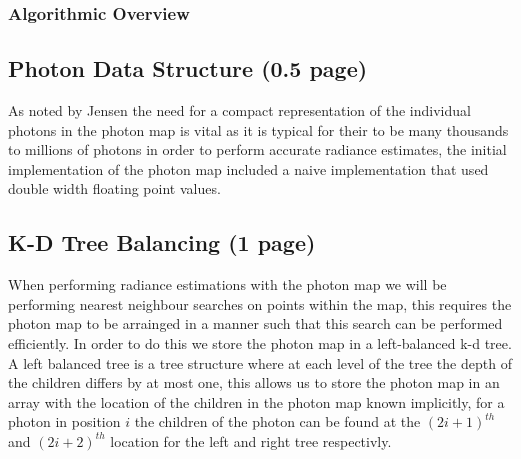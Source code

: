 \subsubsection{Algorithmic Overview}
%
%
%	

\subsection{Photon Data Structure (0.5 page)}
As noted by Jensen  the need for a compact representation of the individual photons in the photon map is vital
as it is typical for their to be many thousands to millions of photons in order to perform accurate radiance estimates,
the initial implementation of the photon map included a naive implementation that used double width floating point values.

\subsection{K-D Tree Balancing (1 page)}
When performing radiance estimations with the photon map we will be performing nearest neighbour searches on points within
the map, this requires the photon map to be arrainged in a manner such that this search can be performed efficiently.
In order to do this we store the photon map in a left-balanced k-d tree. A left balanced tree is a tree structure where
at each level of the tree the depth of the children differs by at most one, 
this allows us to store the photon map in an array with the location of the children in the photon map known implicitly,
for a photon in position $i$ the children of the photon can be found at the $(2i + 1)^{th}$ and $(2i + 2)^{th}$
location for the left and right tree respectivly.


